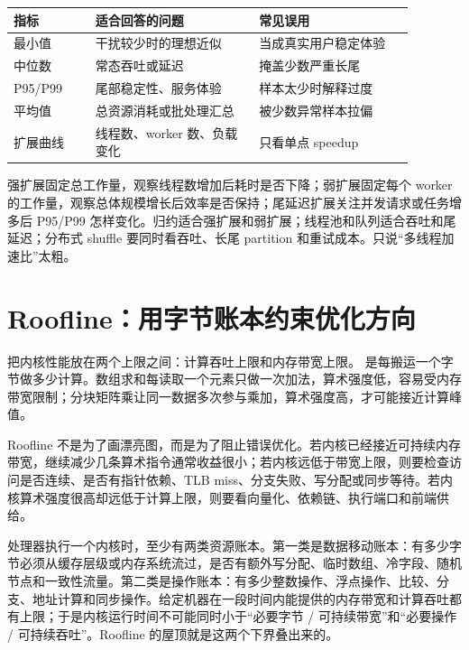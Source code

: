 \begin{center}
\begin{tabular}{p{0.18\linewidth}p{0.36\linewidth}p{0.34\linewidth}}
\toprule
指标 & 适合回答的问题 & 常见误用 \\
\midrule
最小值 & 干扰较少时的理想近似 & 当成真实用户稳定体验 \\
中位数 & 常态吞吐或延迟 & 掩盖少数严重长尾 \\
P95/P99 & 尾部稳定性、服务体验 & 样本太少时解释过度 \\
平均值 & 总资源消耗或批处理汇总 & 被少数异常样本拉偏 \\
扩展曲线 & 线程数、worker 数、负载变化 & 只看单点 speedup \\
\bottomrule
\end{tabular}
\end{center}

强扩展固定总工作量，观察线程数增加后耗时是否下降；弱扩展固定每个 worker 的工作量，观察总体规模增长后效率是否保持；尾延迟扩展关注并发请求或任务增多后 P95/P99 怎样变化。归约适合强扩展和弱扩展；线程池和队列适合吞吐和尾延迟；分布式 shuffle 要同时看吞吐、长尾 partition 和重试成本。只说“多线程加速比”太粗。

\section{Roofline：用字节账本约束优化方向}

 把内核性能放在两个上限之间：计算吞吐上限和内存带宽上限。 是每搬运一个字节做多少计算。数组求和每读取一个元素只做一次加法，算术强度低，容易受内存带宽限制；分块矩阵乘让同一数据多次参与乘加，算术强度高，才可能接近计算峰值。

Roofline 不是为了画漂亮图，而是为了阻止错误优化。若内核已经接近可持续内存带宽，继续减少几条算术指令通常收益很小；若内核远低于带宽上限，则要检查访问是否连续、是否有指针依赖、TLB miss、分支失败、写分配或同步等待。若内核算术强度很高却远低于计算上限，则要看向量化、依赖链、执行端口和前端供给。

处理器执行一个内核时，至少有两类资源账本。第一类是数据移动账本：有多少字节必须从缓存层级或内存系统流过，是否有额外写分配、临时数组、冷字段、随机节点和一致性流量。第二类是操作账本：有多少整数操作、浮点操作、比较、分支、地址计算和同步操作。给定机器在一段时间内能提供的内存带宽和计算吞吐都有上限；于是内核运行时间不可能同时小于“必要字节 / 可持续带宽”和“必要操作 / 可持续吞吐”。Roofline 的屋顶就是这两个下界叠出来的。

